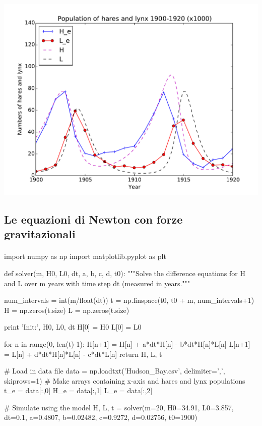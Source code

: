 \documentclass[%
oneside,                 %
final,                   %
10pt]{article}
\begin{document}
\centerline{\includegraphics[width=0.9\linewidth]{fig/Hudson_Bay_sim.pdf}}

\vspace{6mm}




\subsection{Le equazioni di Newton con forze gravitazionali}

\paragraph{}
\bpycod
import numpy as np
import matplotlib.pyplot as plt

def solver(m, H0, L0, dt, a, b, c, d, t0):
    """Solve the difference equations for H and L over m years
    with time step dt (measured in years."""

    num_intervals = int(m/float(dt))
    t = np.linspace(t0, t0 + m, num_intervals+1)
    H = np.zeros(t.size)
    L = np.zeros(t.size)

    print 'Init:', H0, L0, dt
    H[0] = H0
    L[0] = L0

    for n in range(0, len(t)-1):
        H[n+1] = H[n] + a*dt*H[n] - b*dt*H[n]*L[n]
        L[n+1] = L[n] + d*dt*H[n]*L[n] - c*dt*L[n]
    return H, L, t

# Load in data file
data = np.loadtxt('Hudson_Bay.csv', delimiter=',', skiprows=1)
# Make arrays containing x-axis and hares and lynx populations
t_e = data[:,0]
H_e = data[:,1]
L_e = data[:,2]

# Simulate using the model
H, L, t = solver(m=20, H0=34.91, L0=3.857, dt=0.1,
                 a=0.4807, b=0.02482, c=0.9272, d=0.02756,
                 t0=1900)
\end{document}
